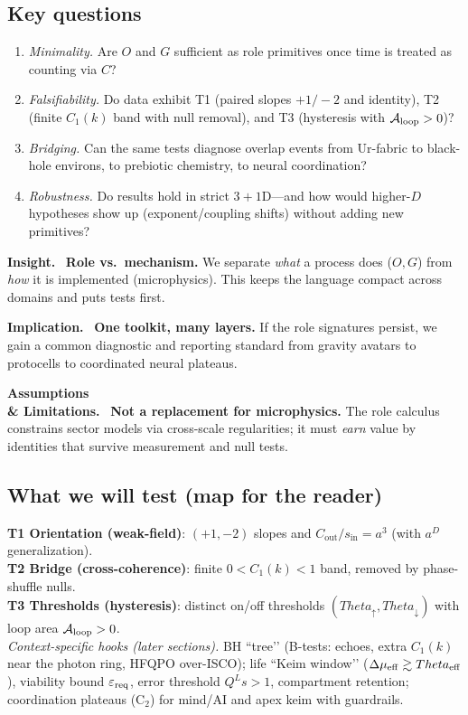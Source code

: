 \documentclass[12pt,a4paper,oneside]{scrreprt}
\def\Theta{Theta}%
\newenvironment{insight}{\par\vspace{0.5em}\noindent\textbf{Insight.}\ }{\par\vspace{0.5em}}
\newenvironment{implication}{\par\vspace{0.5em}\noindent\textbf{Implication.}\ }{\par\vspace{0.5em}}
\newenvironment{limitation}{\par\vspace{0.5em}\noindent\textbf{Assumptions \\ \& Limitations.}\ }{\par\vspace{0.5em}}
\begin{document}
\subsection*{Key questions}
\begin{enumerate}
  \item \emph{Minimality.} Are $O$ and $G$ sufficient as role primitives once time is treated as counting via $C$?
  \item \emph{Falsifiability.} Do data exhibit T1 (paired slopes $+1/-2$ and identity), T2 (finite $C_1(k)$ band with null removal), and T3 (hysteresis with $\mathcal A_{\rm loop}>0$)?
  \item \emph{Bridging.} Can the same tests diagnose overlap events from Ur-fabric to black-hole environs, to prebiotic chemistry, to neural coordination?
  \item \emph{Robustness.} Do results hold in strict $3{+}1$D—and how would higher-$D$ hypotheses show up (exponent/coupling shifts) without adding new primitives?
\end{enumerate}

\begin{insight}
\textbf{Role vs.\ mechanism.} We separate \emph{what} a process does ($O,G$) from \emph{how} it is implemented (microphysics). This keeps the language compact across domains and puts tests first.
\end{insight}

\begin{implication}
\textbf{One toolkit, many layers.} If the role signatures persist, we gain a common diagnostic and reporting standard from gravity avatars to protocells to coordinated neural plateaus.
\end{implication}

\begin{limitation}
\textbf{Not a replacement for microphysics.} The role calculus constrains sector models via cross-scale regularities; it must \emph{earn} value by identities that survive measurement and null tests.
\end{limitation}

\subsection*{What we will test (map for the reader)}
\textbf{T1 Orientation (weak-field)}: $(+1,-2)$ slopes and $C_{\mathrm{out}}/s_{\mathrm{in}}=a^3$ (with $a^{D}$ generalization).\\
\textbf{T2 Bridge (cross-coherence)}: finite $0<C_1(k)<1$ band, removed by phase-shuffle nulls.\\
\textbf{T3 Thresholds (hysteresis)}: distinct on/off thresholds $(\Theta_\uparrow,\Theta_\downarrow)$ with loop area $\mathcal A_{\rm loop}>0$.\\[0.3em]
\emph{Context-specific hooks (later sections).} 
BH “tree’’ (B-tests: echoes, extra $C_1(k)$ near the photon ring, HFQPO over-ISCO); 
life “Keim window’’ ($\Delta\mu_{\rm eff}\gtrsim \Theta_{\rm eff}$), viability bound $\varepsilon_{\rm req}$, error threshold $Q^L s>1$, compartment retention; 
coordination plateaus (C$_2$) for mind/AI and apex keim with guardrails.
\end{document}

